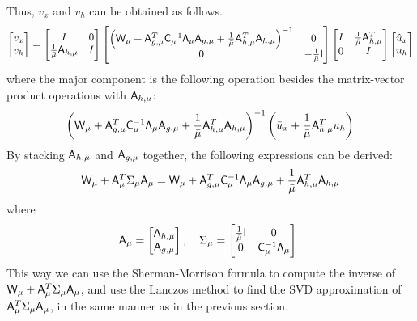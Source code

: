 Thus, $v_x$ and $v_h$ can be obtained as follows.
\begin{equation}\label{eq:core_equ}
\begin{bmatrix} v_x \\ v_h  \end{bmatrix} 
=
\begin{bmatrix}
I & 0 \\
\frac{1}{\bar{\mu}} \mathsf{A}_{h,\mu}  &  I 
\end{bmatrix}
\begin{bmatrix}
\left(\mathsf{W}_\mu +  \mathsf{A}_{g,\mu}^T  \mathsf{C}_\mu^{-1} \mathsf{\Lambda}_\mu  \mathsf{A}_{g,\mu}  
+ \frac{1}{\bar{\mu}}  \mathsf{A}_{h,\mu}^T \mathsf{A}_{h,\mu} \right)^{-1}    & 0 \\
0  &  -\frac{1}{\bar{\mu}}\mathsf{I} 
\end{bmatrix}
\begin{bmatrix}
I  & \frac{1}{\bar{\mu}} \mathsf{A}_{h,\mu}^T  \\
0  &  I
\end{bmatrix}
\begin{bmatrix}
\hat{u}_{x} \\ u_h
\end{bmatrix}
\end{equation}
where the major component is the following operation besides the matrix-vector product operations with $\mathsf{A}_{h,\mu}$: 
\begin{equation}
\left(\mathsf{W}_\mu +  \mathsf{A}_{g,\mu}^T  \mathsf{C}_\mu^{-1} \mathsf{\Lambda}_\mu  \mathsf{A}_{g,\mu}  
+ \frac{1}{\bar{\mu}}  \mathsf{A}_{h,\mu}^T \mathsf{A}_{h,\mu} \right)^{-1}  \left(\bar{u}_x + \frac{1}{\bar{\mu}} \mathsf{A}_{h,\mu}^T u_{h}  \right)
\end{equation}
By stacking $ \mathsf{A}_{h,\mu} $ and $\mathsf{A}_{g,\mu}$ together, 
the following expressions can be derived: 
\begin{equation}\label{pc:eq1}
\mathsf{W}_\mu  +  \mathsf{A}_\mu ^T \Sigma_{\mu} \mathsf{A}_\mu = 
\mathsf{W}_\mu +  \mathsf{A}_{g,\mu}^T  \mathsf{C}_\mu^{-1} \mathsf{\Lambda}_\mu  \mathsf{A}_{g,\mu}  
+ \frac{1}{\bar{\mu}}  \mathsf{A}_{h,\mu}^T \mathsf{A}_{h,\mu} 
\end{equation}
where 
\begin{equation}\label{pc:eq2}
 \mathsf{A}_\mu = 
 \begin{bmatrix}
 \mathsf{A}_{h,\mu} \\
 \mathsf{A}_{g,\mu}
 \end{bmatrix},   \quad 
  \Sigma_{\mu} = 
  \begin{bmatrix}  
  \frac{1}{\bar{\mu}} \mathsf{I}  & 0 \\
  0   &  \mathsf{C}_\mu^{-1} \mathsf{\Lambda}_\mu 
  \end{bmatrix}.
\end{equation}
This way we can use the Sherman-Morrison formula to compute the inverse of 
$\mathsf{W}_\mu  +  \mathsf{A}_\mu ^T \Sigma_{\mu} \mathsf{A}_\mu$, and use the Lanczos method to find the SVD 
approximation of $\mathsf{A}_\mu ^T \Sigma_{\mu} \mathsf{A}_\mu$, in the same manner as in the previous section. 


